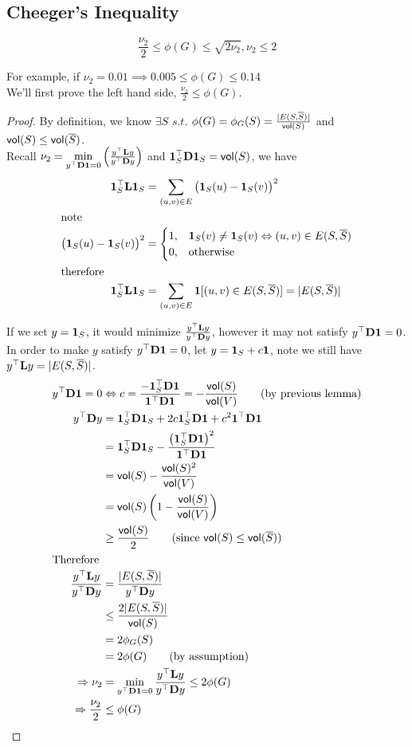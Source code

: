 \documentclass[11pt]{article}
\newcommand\idenVec{\V{1}}
\newcommand\nuReq{y^\top\V{D}\V{1}=0}
\newcommand\nuFrac{\frac{y^\top\V{L}y}{y^\top\V{D}y}}
\begin{document}
\subsection{Cheeger's Inequality}
\begin{theorem}
$$\frac{\nu_2}{2} \leq \phi(G) \leq \sqrt{2\nu_2}, \nu_2 \leq 2$$
\end{theorem}
For example, if $\nu_2 = 0.01 \implies 0.005 \leq \phi(G) \leq 0.14$ \\ 
We'll first prove the left hand side, $\frac{\nu_2}{2} \leq \phi(G)$.
\begin{proof}
By definition, we know $\exists S$ $s.t.$ $\phi(G) = \phi_G(S) = \frac{|E(S, \overline{S})|}{\operatorname{\mathsf{vol}}(S)}$ and $\operatorname{\mathsf{vol}}(S) \leq \operatorname{\mathsf{vol}}(\overline{S})$. \\
Recall $\nu_2=\min\limits_{\nuReq}\paren{\nuFrac}$ and $\idenVec_S^\top\V{D}\idenVec_S = \vol(S)$, we have 
\begin{align*}
\idenVec^\top_S\V{L}\idenVec_S &= \sum\limits_{(u,v)\in E}\paren{\idenVec_S(u) - \idenVec_S(v)}^2\\
\intertext{note}
\paren{\idenVec_S(u) - \idenVec_S(v)}^2 
&= \begin{cases}1,&\idenVec_S(v)\neq\idenVec_S(v)\iff(u,v)\in E(S, \overline{S})\\0,&\text{otherwise}\end{cases}\\
\intertext{therefore}
\idenVec^\top_S\V{L}\idenVec_S 
&= \sum_{(u,v)\in E}\idenVec[(u,v)\in E(S, \overline{S})] = |E(S, \overline{S})|
\end{align*}

If we set $y = \idenVec_S$, it would minimize $\nuFrac$, however it may not satisfy $\nuReq$. In order to make $y$ satisfy $\nuReq$, let $y = \idenVec_S + c\idenVec$, note we still have $y^\top\V{L}y = |E(S, \overline{S})|$.
\begin{align*}
y^\top\V{D}\idenVec = 0 &\iff c = \frac{-\idenVec^\top_S\V{D}\idenVec}{\idenVec^\top\V{D}\idenVec} = -\frac{\vol(S)}{\vol(V)} \tag{by previous lemma} \\ 
y^\top\V{D}y 
&= \idenVec_S^\top\V{D}\idenVec_S + 2c\idenVec_S^\top \V{D}\idenVec + c^2\idenVec^\top\V{D}\idenVec \\
&= \idenVec_S^\top\V{D}\idenVec_S - \frac{\paren{\idenVec^\top_S\V{D}\idenVec}^2}{\idenVec^\top\V{D}\idenVec} \\ 
&= \vol(S) - \frac{\vol(S)^2}{\vol(V)}\\
&= \vol(S)\paren{1 - \frac{\vol(S)}{\vol(V)}} \\
&\geq \frac{\vol(S)}{2} \tag{since $\vol(S) \leq \vol(\overline{S}$)}\\ 
\intertext{Therefore}
\nuFrac
&= \frac{|E(S, \overline{S})|}{y^\top\V{D}y} \\ 
&\leq \frac{2|E(S, \overline{S})|}{\vol(S)} \\ 
&= 2\phi_G(S) \\ 
&= 2\phi(G) \tag{by assumption} \\ 
\implies \nu_2
&= \min\limits_{\nuReq}\nuFrac \leq 2\phi(G) \\
\implies \frac{\nu_2}{2} &\leq \phi(G)
\end{align*}
\end{proof}
\end{document}
